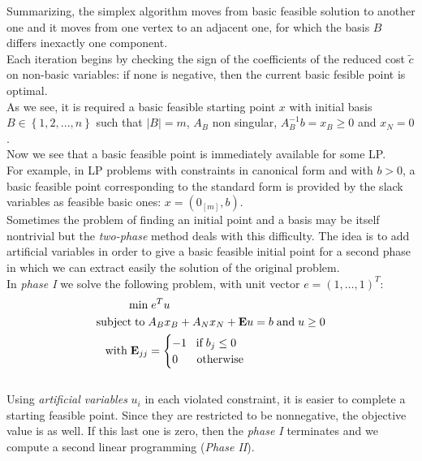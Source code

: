 \documentclass[a4paper,10 pt,titlepage,twoside]{book}
\theoremstyle{plain}
\theoremstyle{definition}
\theoremstyle{remark}
\begin{document}
Summarizing, the simplex algorithm moves from basic feasible solution to another one and it moves from one vertex to an adjacent one, for which the basis $B$ differs inexactly one component.\\ Each iteration begins by checking the sign of the coefficients of the reduced cost $\widetilde{c}$ on non-basic variables: if none is negative, then the current basic fesible point is optimal. \\
As we see, it is required a basic feasible starting point $x$ with initial basis $B \in \left\{ 1,2,..., n \right\}$ such that $|B|=m$, $A_{B}$ non singular, $A_{B}^{-1}b=x_{B} \geq 0$ and $x_{N}=0$.\\[1cm]
Now we see that a basic feasible point is immediately available for some LP.\\ For example, in LP problems with constraints in canonical form and with $b > 0$, a basic feasible point corresponding to the standard form is provided by the slack variables as feasible basic ones: $x =\left(0_{[m]},b\right)$.\\Sometimes the problem of finding an initial point and a basis may be itself nontrivial but the \textit{two-phase} method deals with this difficulty. The idea is to add artificial variables in order to give a basic feasible initial point for a second phase in which we can extract easily the solution of the original problem.\\
In \textit{phase I} we solve the following problem, with unit vector $e= (1,\dots,1)^{T}$:
\begin{equation}\label{IIPH}
\begin{split}
\min &\;e^{T}u\\
\text{subject\;to\;}&A_{B}x_{B}+A_{N}x_{N} + \textbf{E}u = b\;\text{and\;} u\geq 0\\
\text{with\;} \textbf{E}_{jj}& =\begin{cases} -1\;\text{\;\;if\;} b_{j} \leq 0\\
0\;\; \text{\;\;\;\;otherwise}
\end{cases}   
\end{split}
\end{equation} \\
Using \textit{artificial variables} $u_{i}$ in each violated constraint, it is easier to complete a starting feasible point. Since they are restricted to be nonnegative, the objective value is as well. If this last one is zero, then the \textit{phase I} terminates and we compute a second linear programming (\textit{Phase II}).\\
\end{document}
